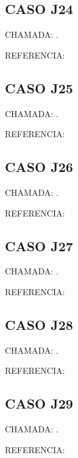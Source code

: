 \documentclass{undftex}
\begin{document}
\begin{refsection}\section*{CASO J24} CHAMADA: . \textcite{j24}\par REFERENCIA:\par\printbibliography[heading=none,check=undfconsultadas]\end{refsection}\clearpage
\begin{refsection}\section*{CASO J25} CHAMADA: . \textcite{j25}\par REFERENCIA:\par\printbibliography[heading=none,check=undfconsultadas]\end{refsection}\clearpage
\begin{refsection}\section*{CASO J26} CHAMADA: . \textcite{j26}\par REFERENCIA:\par\printbibliography[heading=none,check=undfconsultadas]\end{refsection}\clearpage
\begin{refsection}\section*{CASO J27} CHAMADA: . \textcite{j27}\par REFERENCIA:\par\printbibliography[heading=none,check=undfconsultadas]\end{refsection}\clearpage
\begin{refsection}\section*{CASO J28} CHAMADA: . \textcite{j28}\par REFERENCIA:\par\printbibliography[heading=none,check=undfconsultadas]\end{refsection}\clearpage
\begin{refsection}\section*{CASO J29} CHAMADA: . \textcite{j29}\par REFERENCIA:\par\printbibliography[heading=none,check=undfconsultadas]\end{refsection}\clearpage
\end{document}
